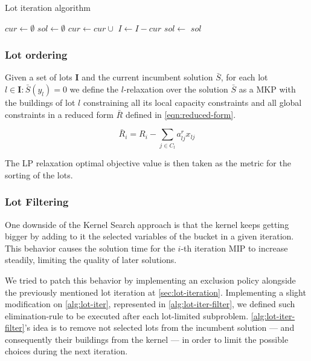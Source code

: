 \documentclass[a4paper, twocolumn, oneside, 10pt]{article}
\begin{document}
\begin{algorithm}
	\caption{Lot iteration algorithm}\label{alg:lot-iter}
	\begin{algorithmic}
		\State $cur \gets \emptyset$
		\State $sol \gets \emptyset$
		\State {}
			\State $cur \gets cur \cup $ 
			\State $I \gets I - cur$
			\State $sol \gets $
		\EndWhile
		\State \Return $sol$
		\EndFunction
	\end{algorithmic}
\end{algorithm}

\subsubsection{Lot ordering}\label{sec:lot-iteration-ordering}
Given a set of lots \(\mathbf{I}\) and the current incumbent solution \(\bar{S}\), for each lot \(l \in \mathbf{I}: \bar{S}(y_l) = 0\) we define the \(l\)-relaxation over the solution \(\bar{S}\) as a \ac{MKP} with the buildings of lot \(l\) constraining all its local capacity constraints and all global constraints in a reduced form \(\bar{R}\) defined in \cref{eqn:reduced-form}. 

\begin{equation}\label{eqn:reduced-form}
	\bar{R}_i = R_i - \sum_{j \in C_l} a^r_{lj}x_{lj}
\end{equation}

The \ac{LP} relaxation optimal objective value is then taken as the metric for the sorting of the lots.

\subsubsection{Lot Filtering}

One downside of the Kernel Search approach is that the kernel keeps getting bigger by adding to it the selected variables of the bucket in a given iteration. This behavior causes the solution time for the \(i\)-th iteration \ac{MIP} to increase steadily, limiting the quality of later solutions.

We tried to patch this behavior by implementing an exclusion policy alongside the previously mentioned lot iteration at \cref{sec:lot-iteration}. Implementing a slight modification on \cref{alg:lot-iter}, represented in \cref{alg:lot-iter-filter}, we defined such elimination-rule to be executed after each lot-limited subproblem. 
\cref{alg:lot-iter-filter}'s idea is to remove not selected lots from the incumbent solution --- and consequently their buildings from the kernel --- in order to limit the possible choices during the next iteration.
\end{document}
